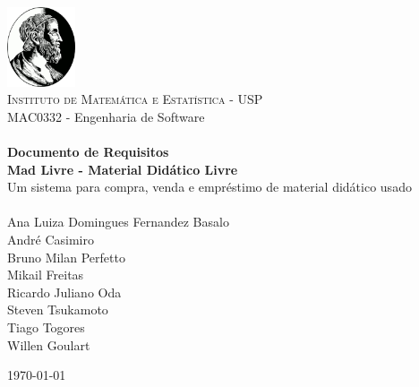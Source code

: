 \begin{titlepage}

\begin{center}
\includegraphics[width=0.15\textwidth]{./ime.png}\\[0.6cm]    

\textsc{\Large Instituto de Matemática e Estatística - USP}\\[0.3cm]
{\large MAC0332 - Engenharia de Software}\\[3.5cm]

\HRule\\[0.8cm]
{\huge \bfseries Documento de Requisitos}\\[0.5cm]
{\LARGE \bfseries Mad Livre - Material Didático Livre}\\[0.2cm]
{\Large Um sistema para compra, venda e empréstimo de material didático
usado}\\[0.6cm]
\HRule\\[3cm]

{\large Ana Luiza Domingues Fernandez Basalo\\[0.3cm]
André Casimiro\\[0.3cm]
Bruno Milan Perfetto\\[0.3cm]
Mikail Freitas\\[0.3cm]
Ricardo Juliano Oda\\[0.3cm]
Steven Tsukamoto\\[0.3cm]
Tiago Togores\\[0.3cm]
Willen Goulart}

\vfill
{\large \today}
\end{center}

\end{titlepage}
